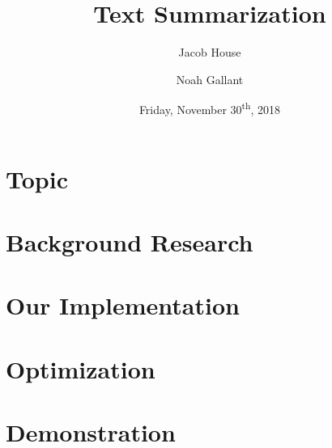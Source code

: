 \documentclass[12pt]{article}
\title{Text Summarization}
\author{Jacob House \and Noah Gallant}
\date{Friday, November 30\textsuperscript{th}, 2018}
\begin{document}
	\maketitle
	\tableofcontents 
	\section{Topic}
	
	
	\section{Background Research}
	
	
	\section{Our Implementation}
	
	
	\section{Optimization}
	
	
	\printbibliography
	\appendix
	\section{Demonstration}
	
	
\end{document}
